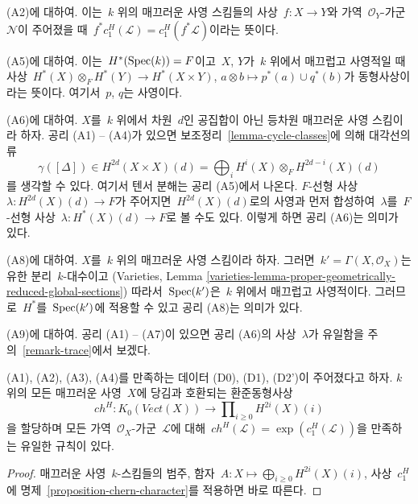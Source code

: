 \medskip\noindent
(A2)에 대하여. 이는\  $k$ 위의 매끄러운 사영 스킴들의 사상\ 
$f : X \to Y$와 가역\  $\mathcal{O}_Y$-가군\  $\mathcal{N}$이
주어졌을 때\ 
$f^*c_1^H(\mathcal{L}) = c_1^H(f^*\mathcal{L})$이라는 뜻이다.

\medskip\noindent
(A5)에 대하여. 이는\  $H^*(\mathop{\mathrm{Spec}}(k)) = F$이고\  $X$, $Y$가\  $k$ 위에서
매끄럽고 사영적일 때 사상\ 
$H^*(X) \otimes_F H^*(Y) \to H^*(X \times Y)$,
$a \otimes b \mapsto p^*(a) \cup q^*(b)$가 동형사상이라는 뜻이다.
여기서\  $p$, $q$는 사영이다.

\medskip\noindent
(A6)에 대하여. $X$를\  $k$ 위에서 차원\  $d$인 공집합이 아닌 등차원
매끄러운 사영 스킴이라 하자. 공리 (A1) -- (A4)가 있으면 보조정리\ 
\ref{lemma-cycle-classes}에 의해 대각선의 류
$$
\gamma([\Delta]) \in
H^{2d}(X \times X)(d) = \bigoplus\nolimits_i H^i(X) \otimes_F H^{2d - i}(X)(d)
$$
를 생각할 수 있다. 여기서 텐서 분해는 공리 (A5)에서 나온다.
$F$-선형 사상\  $\lambda : H^{2d}(X)(d) \to F$가 주어지면\ 
$H^{2d}(X)(d)$로의 사영과 먼저 합성하여\  $\lambda$를\ 
$F$-선형 사상\  $\lambda : H^*(X)(d) \to F$로 볼 수도 있다.
이렇게 하면 공리 (A6)는 의미가 있다.

\medskip\noindent
(A8)에 대하여. $X$를\  $k$ 위의 매끄러운 사영 스킴이라 하자.
그러면\  $k' = \Gamma(X, \mathcal{O}_X)$는 유한 분리\  $k$-대수이고
(Varieties, Lemma
\ref{varieties-lemma-proper-geometrically-reduced-global-sections})
따라서\  $\mathop{\mathrm{Spec}}(k')$은\  $k$ 위에서 매끄럽고 사영적이다. 그러므로\ 
$H^*$를\  $\mathop{\mathrm{Spec}}(k')$에 적용할 수 있고 공리 (A8)는 의미가 있다.

\medskip\noindent
(A9)에 대하여. 공리 (A1) -- (A7)이 있으면 공리 (A6)의 사상\ 
$\lambda$가 유일함을 주의\  \ref{remark-trace}에서 보겠다.

\begin{lemma}
\label{lemma-chern-classes}
(A1), (A2), (A3), (A4)를 만족하는 데이터 (D0), (D1), (D2')이
주어졌다고 하자. $k$ 위의 모든 매끄러운 사영\  $X$에 당김과
호환되는 환준동형사상
$$
ch^H :
K_0(\textit{Vect}(X))
\longrightarrow
\prod\nolimits_{i \geq 0} H^{2i}(X)(i)
$$
을 할당하며 모든 가역\  $\mathcal{O}_X$-가군\  $\mathcal{L}$에 대해\ 
$ch^H(\mathcal{L}) = \exp(c_1^H(\mathcal{L}))$을 만족하는 유일한
규칙이 있다.
\end{lemma}

\begin{proof}
매끄러운 사영\  $k$-스킴들의 범주, 함자\ 
$A : X \mapsto \bigoplus_{i \geq 0} H^{2i}(X)(i)$, 사상\  $c_1^H$에
명제\  \ref{proposition-chern-character}를 적용하면 바로 따른다.
\end{proof}

